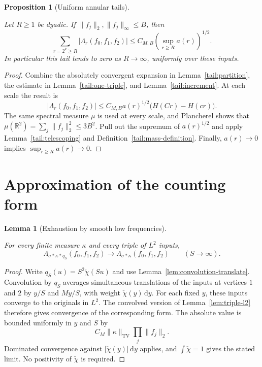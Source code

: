 \documentclass[11pt]{amsart}
\newcommand{\R}{\mathbb R}
\newcommand{\dd}{\,\mathrm d}
\newtheorem{lemma}[theorem]{Lemma}
\newtheorem{proposition}[theorem]{Proposition}
\theoremstyle{definition}
\theoremstyle{remark}
\numberwithin{equation}{section}
\providecommand{\lean}[1]{}
\providecommand{\leanok}{}
\begin{document}
\begin{proposition}[Uniform annular tails]\label{tail:bound}
\lean{Auto.tail_bound,Auto.tail_bound_tendsto}
\leanok
Let $R\ge1$ be dyadic. If $\|f_j\|_2,\|f_j\|_\infty\le B$, then
\[
 \sum_{r=2^k\ge R}|\Lambda_r(f_0,f_1,f_2)|
       \le C_{M,B}\left(\sup_{r\ge R}a(r)\right)^{1/2}.
\]
In particular this tail tends to zero as $R\to\infty$, uniformly over
these inputs.
\end{proposition}
\begin{proof}
Combine the absolutely convergent expansion in
Lemma~\ref{tail:partition}, the estimate in
Lemma~\ref{tail:one-triple}, and Lemma~\ref{tail:increment}. At each
scale the result is
\[
 |\Lambda_r(f_0,f_1,f_2)|
   \le C_{M,B}a(r)^{1/2}\big(H(Cr)-H(cr)\big).
\]
The same spectral measure $\mu$ is used at every scale, and Plancherel
shows that $\mu(\R^2)=\sum_j\|f_j\|_2^2\le3B^2$. Pull out the
supremum of $a(r)^{1/2}$ and apply Lemma~\ref{tail:telescoping} and
Definition~\ref{tail:mass-definition}. Finally,
$a(r)\to0$ implies $\sup_{r\ge R}a(r)\to0$.
\end{proof}

\section{Approximation of the counting form}\label{tail:approximation-section}

\begin{lemma}[Exhaustion by smooth low frequencies]\label{tail:exhaustion}
\lean{Auto.tail_exhaustion}
\leanok
For every finite measure $\kappa$ and every triple of $L^2$ inputs,
\[
 \Lambda_{\sigma*\kappa*q_S}(f_0,f_1,f_2)
       \longrightarrow\Lambda_{\sigma*\kappa}(f_0,f_1,f_2)
       \qquad(S\to\infty).
\]
\end{lemma}
\begin{proof}
Write $q_S(u)=S^2\check\chi(Su)$ and use
Lemma~\ref{lem:convolution-translate}. Convolution by $q_S$ averages
simultaneous translations of the inputs at vertices $1$ and $2$ by
$y/S$ and $My/S$, with weight $\check\chi(y)\dd y$. For each fixed
$y$, these inputs converge to the originals in $L^2$. The convolved
version of Lemma~\ref{lem:triple-l2} therefore gives convergence of
the corresponding form. The absolute value is bounded uniformly in
$y$ and $S$ by
\[
 C_M\|\kappa\|_{\mathrm{TV}}\prod_j\|f_j\|_2.
\]
Dominated convergence against $|\check\chi(y)|\dd y$ applies, and
$\int\check\chi=1$ gives the stated limit. No positivity of
$\check\chi$ is required.
\end{proof}
\end{document}
